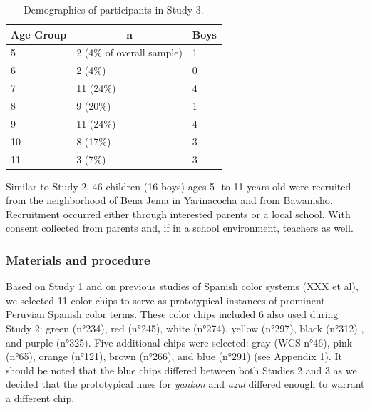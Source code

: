 \documentclass[
  english,
  ,man,floatsintext]{apa6}
\begin{document}
\begin{table}[tbp]

\begin{center}
\begin{threeparttable}

\caption{\label{tab:study3-demographics}Demographics of participants in Study 3.}

\begin{tabular}{lll}
\toprule
Age Group & \multicolumn{1}{c}{n} & \multicolumn{1}{c}{Boys}\\
\midrule
5 & 2 (4\% of overall sample) & 1\\
6 & 2 (4\%) & 0\\
7 & 11 (24\%) & 4\\
8 & 9 (20\%) & 1\\
9 & 11 (24\%) & 4\\
10 & 8 (17\%) & 3\\
11 & 3 (7\%) & 3\\
\bottomrule
\end{tabular}

\end{threeparttable}
\end{center}

\end{table}

Similar to Study 2, 46 children (16 boys) ages 5- to 11-years-old were recruited from the neighborhood of Bena Jema in Yarinacocha and from Bawanisho. Recruitment occurred either through interested parents or a local school. With consent collected from parents and, if in a school environment, teachers as well.

\hypertarget{materials-and-procedure-2}{%
\subsubsection{Materials and procedure}\label{materials-and-procedure-2}}

Based on Study 1 and on previous studies of Spanish color systems (XXX et al), we selected 11 color chips to serve as prototypical instances of prominent Peruvian Spanish color terms. These color chips included 6 also used during Study 2: green (n°234), red (n°245), white (n°274), yellow (n°297), black (n°312) , and purple (n°325). Five additional chips were selected: gray (WCS n°46), pink (n°65), orange (n°121), brown (n°266), and blue (n°291) (see Appendix 1). It should be noted that the blue chips differed between both Studies 2 and 3 as we decided that the prototypical hues for \emph{yankon} and \emph{azul} differed enough to warrant a different chip.
\end{document}
